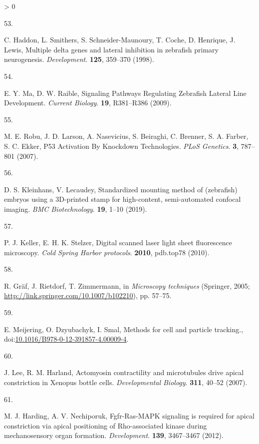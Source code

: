 \documentclass[10pt, b5paper, singlespacinge, twoside]{reedthesis} %
\newlength{\cslhangindent}
\newlength{\csllabelwidth}
\newenvironment{CSLReferences}[3] %
  {%
    \setlength{\parindent}{0pt}
    \ifodd #1 \everypar{\setlength{\hangindent}{\cslhangindent}}\ignorespaces\fi
    \ifnum #2 > 0
    \setlength{\parskip}{#2\baselineskip}
    \fi
  }%
  {}
\newcommand{\CSLLeftMargin}[1]{\parbox[t]{\maxof{\widthof{#1}}{\csllabelwidth}}{#1}}
\newcommand{\CSLRightInline}[1]{\parbox[t]{\linewidth}{#1}}
\theoremstyle{definition}
\theoremstyle{definition}
\theoremstyle{definition}
\theoremstyle{remark}
\begin{document}
\begin{CSLReferences}{0}{0}
\leavevmode\hypertarget{ref-Haddon1998}{}%
\CSLLeftMargin{53. }
\CSLRightInline{C. Haddon, L. Smithers, S. Schneider-Maunoury, T. Coche, D. Henrique, J. Lewis, {Multiple delta genes and lateral inhibition in zebrafish primary neurogenesis}. \emph{Development}. \textbf{125}, 359--370 (1998).}

\leavevmode\hypertarget{ref-Ma2009}{}%
\CSLLeftMargin{54. }
\CSLRightInline{E. Y. Ma, D. W. Raible, {Signaling Pathways Regulating Zebrafish Lateral Line Development}. \emph{Current Biology}. \textbf{19}, R381--R386 (2009).}

\leavevmode\hypertarget{ref-Robu2007}{}%
\CSLLeftMargin{55. }
\CSLRightInline{M. E. Robu, J. D. Larson, A. Nasevicius, S. Beiraghi, C. Brenner, S. A. Farber, S. C. Ekker, {P53 Activation By Knockdown Technologies}. \emph{PLoS Genetics}. \textbf{3}, 787--801 (2007).}

\leavevmode\hypertarget{ref-Kleinhans2019}{}%
\CSLLeftMargin{56. }
\CSLRightInline{D. S. Kleinhans, V. Lecaudey, {Standardized mounting method of (zebrafish) embryos using a 3D-printed stamp for high-content, semi-automated confocal imaging}. \emph{BMC Biotechnology}. \textbf{19}, 1--10 (2019).}

\leavevmode\hypertarget{ref-Keller2010c}{}%
\CSLLeftMargin{57. }
\CSLRightInline{P. J. Keller, E. H. K. Stelzer, {Digital scanned laser light sheet fluorescence microscopy.} \emph{Cold Spring Harbor protocols}. \textbf{2010}, pdb.top78 (2010).}

\leavevmode\hypertarget{ref-Graf2005}{}%
\CSLLeftMargin{58. }
\CSLRightInline{R. Gräf, J. Rietdorf, T. Zimmermann, in \emph{Microscopy techniques} (Springer, 2005; \url{http://link.springer.com/10.1007/b102210}), pp. 57--75.}

\leavevmode\hypertarget{ref-Meijering2012}{}%
\CSLLeftMargin{59. }
\CSLRightInline{E. Meijering, O. Dzyubachyk, I. Smal, {Methods for cell and particle tracking.}, doi:\href{https://doi.org/10.1016/B978-0-12-391857-4.00009-4}{10.1016/B978-0-12-391857-4.00009-4}.}

\leavevmode\hypertarget{ref-Lee2009}{}%
\CSLLeftMargin{60. }
\CSLRightInline{J. Lee, R. M. Harland, {Actomyosin contractility and microtubules drive apical constriction in Xenopus bottle cells}. \emph{Developmental Biology}. \textbf{311}, 40--52 (2007).}

\leavevmode\hypertarget{ref-Harding2012}{}%
\CSLLeftMargin{61. }
\CSLRightInline{M. J. Harding, A. V. Nechiporuk, {Fgfr-Ras-MAPK signaling is required for apical constriction via apical positioning of Rho-associated kinase during mechanosensory organ formation}. \emph{Development}. \textbf{139}, 3467--3467 (2012).}


\end{CSLReferences}
\end{document}

